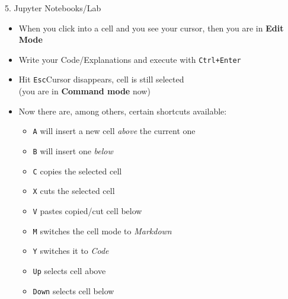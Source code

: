 
\begin{vbframe}{5. Jupyter Notebooks/Lab}

\vfill

\begin{itemize}
	\item When you click into a cell and you see your cursor, then you are in \textbf{Edit Mode}
	\item Write your Code/Explanations and execute with \texttt{Ctrl+Enter}
	\item Hit \texttt{Esc}\rightarrow Cursor disappears, cell is still selected\\
  (you are in \textbf{Command mode} now)
	\item Now there are, among others, certain shortcuts available:
	\begin{itemize}
		\item \texttt{A} will insert a new cell \textit{above} the current one
    \item \texttt{B} will insert one \textit{below}
    \item \texttt{C} copies the selected cell
    \item \texttt{X} cuts the selected cell
    \item \texttt{V} pastes copied/cut cell below
    \item \texttt{M} switches the cell mode to \textit{Markdown}
    \item \texttt{Y} switches it to \textit{Code}
    \item \texttt{Up} selects cell above
    \item \texttt{Down} selects cell below
	\end{itemize}
\end{itemize}

\vfill

\end{vbframe}


